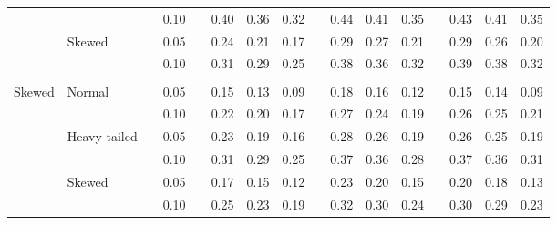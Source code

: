 \documentclass[12pt]{article} %
\begin{document}
\begin{table}[ht]
\begin{scriptsize}
\begin{center}
\begin{tabular}{ll p{.1cm} c p{.1cm} rrr p{.1cm} rrr p{.1cm} rrr}
             &              && 0.10 &&   0.40 & 0.36 & 0.32 && 0.44 & 0.41 & 0.35 &&  0.43 & 0.41 & 0.35 \\
             & Skewed       && 0.05 &&   0.24 & 0.21 & 0.17 && 0.29 & 0.27 & 0.21 &&  0.29 & 0.26 & 0.20 \\
             &              && 0.10 &&   0.31 & 0.29 & 0.25 && 0.38 & 0.36 & 0.32 &&  0.39 & 0.38 & 0.32 \\
             &&&&&&&&&&&&&&&\\
Skewed       & Normal       && 0.05 &&   0.15 & 0.13 & 0.09 && 0.18 & 0.16 & 0.12 &&  0.15 & 0.14 & 0.09 \\ 
             &              && 0.10 &&   0.22 & 0.20 & 0.17 && 0.27 & 0.24 & 0.19 &&  0.26 & 0.25 & 0.21 \\ 
             & Heavy tailed && 0.05 &&   0.23 & 0.19 & 0.16 && 0.28 & 0.26 & 0.19 &&  0.26 & 0.25 & 0.19 \\ 
             &              && 0.10 &&   0.31 & 0.29 & 0.25 && 0.37 & 0.36 & 0.28 &&  0.37 & 0.36 & 0.31 \\ 
             & Skewed       && 0.05 &&   0.17 & 0.15 & 0.12 && 0.23 & 0.20 & 0.15 &&  0.20 & 0.18 & 0.13 \\ 
             &              && 0.10 &&   0.25 & 0.23 & 0.19 && 0.32 & 0.30 & 0.24 &&  0.30 & 0.29 & 0.23 \\ 


\end{tabular}
\end{center}
\end{scriptsize}
\end{table}
\end{document}
